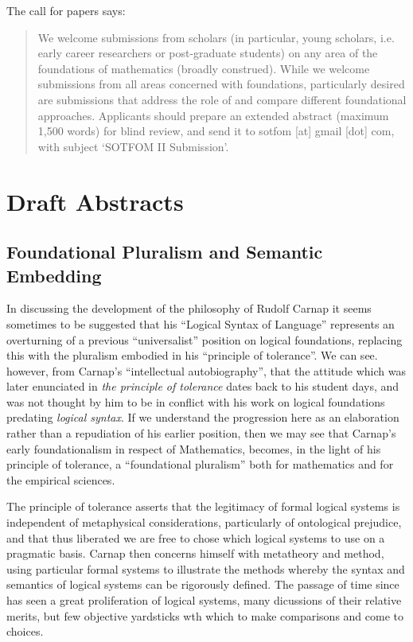 \documentclass[10pt,titlepage]{article}
\begin{document}
The call for papers says:
\begin{quotation}
We welcome submissions from scholars (in particular, young scholars, i.e. early career researchers or post-graduate students) on any area of the foundations of mathematics (broadly construed). While we welcome submissions from all areas concerned with foundations, particularly desired are submissions that address the role of and compare different foundational approaches. Applicants should prepare an extended abstract (maximum 1,500 words) for blind review, and send it to sotfom [at] gmail [dot] com, with subject `SOTFOM II Submission’.
\end{quotation}

\section{Draft Abstracts}
\pagebreak
\subsection{Foundational Pluralism and Semantic Embedding}

In discussing the development of the philosophy of Rudolf Carnap it seems sometimes to be suggested that his ``Logical Syntax of Language'' represents an overturning of a previous ``universalist'' position on logical foundations, replacing this with the pluralism embodied in his ``principle of tolerance''.
We can see. however, from Carnap's ``intellectual autobiography'', that the attitude which was later enunciated in \emph{the principle of tolerance} dates back to his student days, and was not thought by him to be in conflict with his work on logical foundations predating \emph{logical syntax}.
If we understand the progression here as an elaboration rather than a repudiation of his earlier position, then we may see that Carnap's early foundationalism in respect of Mathematics, becomes, in the light of his principle of tolerance, a ``foundational pluralism'' both for mathematics and for the empirical sciences.

The principle of tolerance asserts that the legitimacy of formal logical systems is independent of metaphysical considerations, particularly of ontological prejudice, and that thus liberated we are free to chose which logical systems to use on a pragmatic basis.
Carnap then concerns himself with metatheory and method, using particular formal systems to illustrate the methods whereby the syntax and semantics of logical systems can be rigorously defined.
The passage of time since has seen a great proliferation of logical systems, many dicussions of their relative merits, but few objective yardsticks wth which to make comparisons and come to choices.
\end{document}
